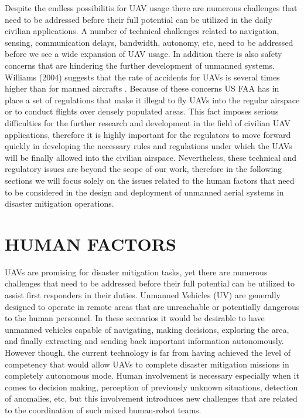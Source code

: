 \documentclass[12pt, letterpaper, oneside]{article}
\begin{document}
Despite the endless possibilitis for UAV usage there are numerous challenges that need to be addressed before their full potential can be utilized in the daily civilian applications. A number of technical challenges related to navigation, sensing, communication delays, bandwidth, autonomy, etc, need to be addressed before we see a wide expansion of UAV usage. In addition there is also safety concerns that are hindering the further development of unmanned systems. Williams (2004) suggests that the rate of accidents for UAVs is several times higher than for manned aircrafts \cite{19}. Because of these concerns US FAA has in place a set of regulations that make it illegal to fly UAVs into the regular airspace or to conduct flights over densely populated areas. This fact imposes serious difficulties for the further research and development in the field of civilian UAV applications, therefore it is highly important for the regulators to move forward quickly in developing the necessary rules and regulations under which the UAVs will be finally allowed into the civilian airspace. Nevertheless, these technical and regulatory issues are beyond the scope of our work, therefore in the following sections we will focus solely on the issues related to the human factors that need to be considered in the design and deployment of unmanned aerial systems in disaster mitigation operations. 

\section{HUMAN FACTORS}
UAVs are promising for disaster mitigation tasks, yet there are numerous challenges that need to be addressed before their full potential can be utilized to assist first responders in their duties. Unmanned Vehicles (UV) are generally designed to operate in remote areas that are unreachable or potentially dangerous to the human personnel. In these scenarios it would be desirable to have unmanned vehicles capable of navigating, making decisions, exploring the area, and finally extracting and sending back important information autonomously. However though, the current technology is far from having achieved the level of competency that would allow UAVs to complete disaster mitigation missions in completely autonomous mode. Human involvement is necessary especially when it comes to decision making, perception of previously unknown situations, detection of anomalies, etc, but this involvement introduces new challenges that are related to the coordination of such mixed human-robot teams.
\end{document}
